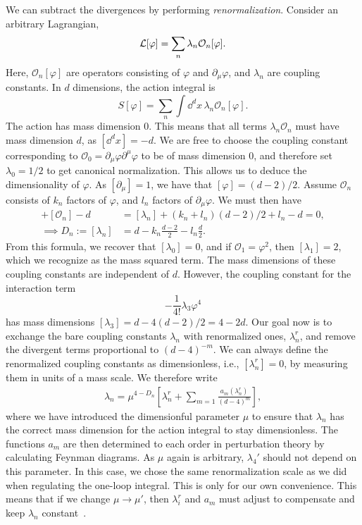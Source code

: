We can subtract the divergences by performing \emph{renormalization}.
Consider an arbitrary Lagrangian, 
%
\begin{equation}
    \mathcal{L}[\varphi] = \sum_n \lambda_n \mathcal{O}_n[\varphi].
\end{equation}
%
Here, $\mathcal{O}_n[\varphi]$ are operators consisting of $\varphi$ and $\partial_\mu \varphi$, and $\lambda_n$ are coupling constants.
In $d$ dimensions, the action integral is
%
\begin{equation}
    S[\varphi] = \sum_n \int \dd^d x \, \lambda_n \mathcal{O}_n[\varphi].
\end{equation}
%
The action has mass dimension $0$.
This means that all terms $\lambda_n \mathcal O_n$ must have mass dimension $d$, as $[\dd^d x] = -d$.
We are free to choose the coupling constant corresponding to $\mathcal O_0 = \partial_\mu \varphi \partial^\mu \varphi$ to be of mass dimension 0, and therefore set $\lambda_0 = 1/2$ to get canonical normalization.
This allows us to deduce the dimensionality of $\varphi$.
As $[\partial_\mu] = 1$, we have that $[\varphi] = (d-2)/2$.
Assume $\mathcal O_n$ consists of $k_n$ factors of $\varphi$, and $l_n$ factors of $\partial_\mu \varphi$.
We must then have
%
\begin{align}
    [\lambda_n] + [\mathcal{O}_n] - d &= [\lambda_n] + (k_n + l_n)(d - 2) / 2 + l_n - d = 0, \\
    \implies D_n := [\lambda_n] &= d - k_n \frac{d - 2}{2} - l_n \frac{d}{2}.
\end{align}
%
From this formula, we recover that $[\lambda_0] = 0$, and if $\mathcal O_1 = \varphi^2$, then $[\lambda_1] = 2$, which we recognize as the mass squared term.
The mass dimensions of these coupling constants are independent of $d$.
However, the coupling constant for the interaction term
\begin{equation}
    - \frac{1}{4!} \lambda_3 \varphi^4
\end{equation}
has mass dimensions $[\lambda_3] = d -4(d-2)/2 = 4 - 2d$.
Our goal now is to exchange the bare coupling constants $\lambda_n$ with renormalized ones, $\lambda_n^r$, and remove the divergent terms proportional to $(d - 4)^{-m}$.
We can always define the renormalized coupling constants as dimensionless, i.e., $[\lambda_n^r] = 0$, by measuring them in units of a mass scale.
We therefore write 
%
\begin{align*}
    \lambda_n = \mu^{4 - D_n}
    \left[
        \lambda_n^r + \sum_{m=1} \frac{a_m(\lambda_n^r)}{(d - 4)^{m}}
    \right],
\end{align*}
%
where we have introduced the dimensionful parameter $\mu$ to ensure that $\lambda_n$ has the correct mass dimension for the action integral to stay dimensionless.
The functions $a_m$ are then determined to each order in perturbation theory by calculating Feynman diagrams.
As $\mu$ again is arbitrary, $\lambda_4'$ should not depend on this parameter.
In this case, we chose the same renormalization scale as we did when regulating the one-loop integral.
This is only for our own convenience.
This means that if we change $\mu \rightarrow \mu'$, then $\lambda_i^r$ and $a_m$ must adjust to compensate and keep $\lambda_n$ constant~\autocite{thooftDimensionalRegularizationRenormalization1973}.

